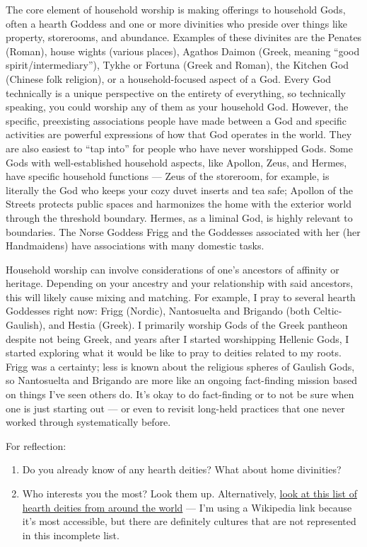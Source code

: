 \documentclass[
]{book}
\providecommand{\tightlist}{%
  \setlength{\itemsep}{0pt}\setlength{\parskip}{0pt}}
\begin{document}
The core element of household worship is making offerings to household Gods, often a hearth Goddess and one or more divinities who preside over things like property, storerooms, and abundance. Examples of these divinites are the Penates (Roman), house wights (various places), Agathos Daimon (Greek, meaning ``good spirit/intermediary''), Tykhe or Fortuna (Greek and Roman), the Kitchen God (Chinese folk religion), or a household-focused aspect of a God. Every God technically is a unique perspective on the entirety of everything, so technically speaking, you could worship any of them as your household God. However, the specific, preexisting associations people have made between a God and specific activities are powerful expressions of how that God operates in the world. They are also easiest to ``tap into'' for people who have never worshipped Gods. Some Gods with well-established household aspects, like Apollon, Zeus, and Hermes, have specific household functions --- Zeus of the storeroom, for example, is literally the God who keeps your cozy duvet inserts and tea safe; Apollon of the Streets protects public spaces and harmonizes the home with the exterior world through the threshold boundary. Hermes, as a liminal God, is highly relevant to boundaries. The Norse Goddess Frigg and the Goddesses associated with her (her Handmaidens) have associations with many domestic tasks.

Household worship can involve considerations of one's ancestors of affinity or heritage. Depending on your ancestry and your relationship with said ancestors, this will likely cause mixing and matching. For example, I pray to several hearth Goddesses right now: Frigg (Nordic), Nantosuelta and Brigando (both Celtic-Gaulish), and Hestia (Greek). I primarily worship Gods of the Greek pantheon despite not being Greek, and years after I started worshipping Hellenic Gods, I started exploring what it would be like to pray to deities related to my roots. Frigg was a certainty; less is known about the religious spheres of Gaulish Gods, so Nantosuelta and Brigando are more like an ongoing fact-finding mission based on things I've seen others do. It's okay to do fact-finding or to not be sure when one is just starting out --- or even to revisit long-held practices that one never worked through systematically before.

For reflection:

\begin{enumerate}
\def\labelenumi{\arabic{enumi}.}
\tightlist
\item
  Do you already know of any hearth deities? What about home divinities?
\item
  Who interests you the most? Look them up. Alternatively, \href{https://en.wikipedia.org/wiki/Household_deity\#List}{look at this list of hearth deities from around the world} --- I'm using a Wikipedia link because it's most accessible, but there are definitely cultures that are not represented in this incomplete list.
\end{enumerate}
\end{document}
